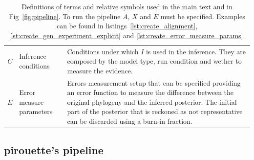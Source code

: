 \documentclass{article}
\begin{document}
\begin{table}
\begin{tabular}{|@{}c|p{4cm}|p{12cm}|}
    $\mathit{C}$ & Inference conditions & Conditions under which $\mathit{I}$ 
    is used in the inference. 
    They are composed by the model type, run condition and 
    wether to measure the evidence. \\
    $\mathit{E}$ & Error measure parameters & 
    Errors measurement setup that can be specified providing an 
    error function to measure the difference between the original phylogeny 
    and the inferred posterior. The initial part of the posterior that is 
    reckoned as not representative can be discarded using a burn-in fraction. \\

    \hline 
  \end{tabular}
  \caption{
    Definitions of terms and relative symbols used in the main text and in 
    Fig~\ref{fig:pipeline}. To run the pipeline $\mathit{A}$, $\mathit{X}$ 
    and $\mathit{E}$ must be specified. Examples can be found in 
    listings~\ref{lst:create_alignment}, 
    \ref{lst:create_gen_experiment_explicit} and 
    \ref{lst:create_error_measure_params}.
  }
  \label{tab:definitions}
\end{table}

\subsection{pirouette's pipeline}
\label{subsec:pipeline}
\end{document}

